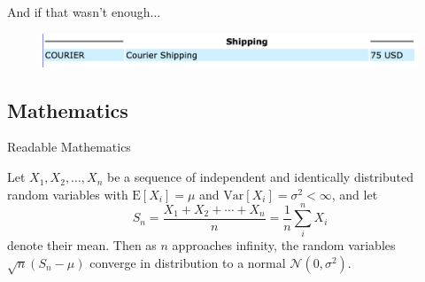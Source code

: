 \documentclass{beamer}
\begin{document}
\begin{frame}{And if that wasn't enough...}
  \begin{figure}
    \includegraphics[width=\textwidth]{ida-shipping.png}
  \end{figure}
\end{frame}



\subsection{Mathematics}

\begin{frame}{Readable Mathematics}

Let $X_1, X_2, \ldots, X_n$ be a sequence of independent and identically distributed random variables with $\text{E}[X_i] = \mu$ and $\text{Var}[X_i] = \sigma^2 < \infty$, and let
$$S_n = \frac{X_1 + X_2 + \cdots + X_n}{n}
      = \frac{1}{n}\sum_{i}^{n} X_i$$
denote their mean. Then as $n$ approaches infinity, the random variables $\sqrt{n}(S_n - \mu)$ converge in distribution to a normal $\mathcal{N}(0, \sigma^2)$.

\end{frame}
\end{document}
